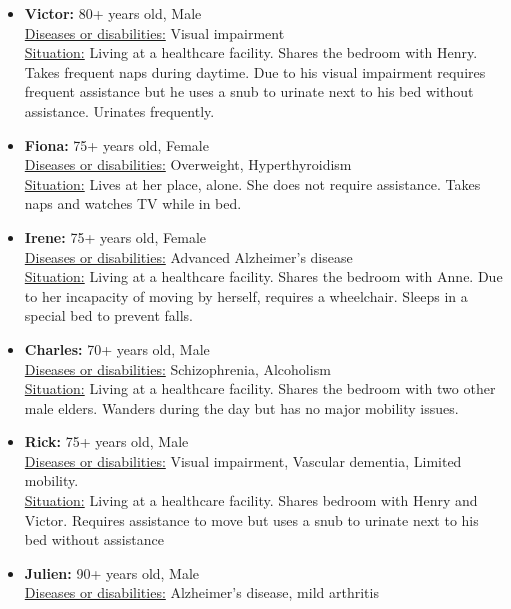 \documentclass[oneside, twocolumn]{article}
\begin{document}
\begin{itemize}
	\item \textbf{Victor:} 80+ years old, Male \\
			\underline{Diseases or disabilities:} Visual impairment \\
			\underline{Situation:} Living at a healthcare facility. Shares the bedroom with Henry. Takes frequent naps during daytime. Due to his visual impairment requires frequent assistance but he uses a snub to urinate next to his bed without assistance. Urinates frequently. \\
	\item \textbf{Fiona:} 75+ years old, Female \\
			\underline{Diseases or  disabilities:} Overweight, Hyperthyroidism \\
			\underline{Situation:} Lives at her place, alone. She does not require assistance. Takes naps and watches TV while in bed. \\
	\item \textbf{Irene:} 75+ years old, Female \\
			\underline{Diseases or  disabilities:} Advanced Alzheimer's disease \\
			\underline{Situation:} Living at a healthcare facility. Shares the bedroom with  Anne. Due to her incapacity of moving by herself, requires a wheelchair. Sleeps in  a special bed to prevent falls. \\
	\item \textbf{Charles:} 70+ years old, Male \\
			\underline{Diseases or  disabilities:}  Schizophrenia, Alcoholism \\
			\underline{Situation:} Living at a healthcare facility. Shares the bedroom with two other male elders. Wanders during the day but has no major mobility issues. \\
	\item \textbf{Rick:} 75+ years old, Male \\
			\underline{Diseases or  disabilities:} Visual impairment, Vascular dementia,  Limited mobility. \\
			\underline{Situation:} Living at a healthcare facility. Shares bedroom with Henry and Victor. Requires assistance to move but uses a snub to urinate next to his bed without assistance \\
	\item \textbf{Julien:} 90+ years old, Male \\
			\underline{Diseases or disabilities:} Alzheimer's   disease, mild arthritis \\

\end{itemize}
\end{document}
